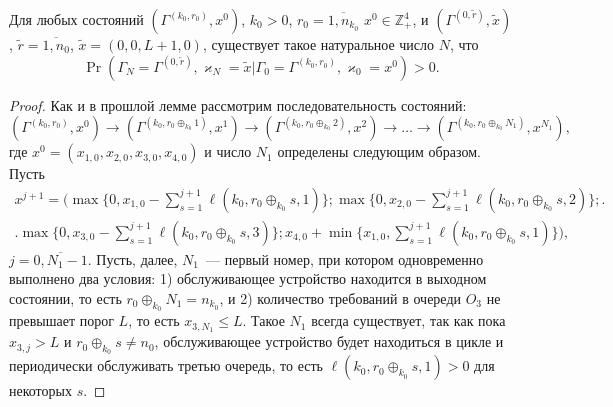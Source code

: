 \documentclass[a4paper,12pt,russian]{extarticle}
\begin{document}
\begin{lemma}\label{class:2}
Для любых состояний $(\Gamma^{(k_0,r_0)},x^0)$, $k_0 > 0$, $r_0=\overline{1,n_{k_0}}$ $x^0 \in \mathbb{Z}_+^4$, и $(\Gamma^{(0,\tilde{r})},\tilde{x})$, $\tilde{r} = \overline{1,n_0}$, $\tilde{x}=(0,0,L+1,0)$, существует такое натуральное число $N$, что 
\begin{equation*}
\Pr(\Gamma_{N}=\Gamma^{(0,\tilde{r} )}, \varkappa_{N}=\tilde{x}|
\Gamma_{0}=\Gamma^{(k_0,r_0)}, \varkappa_{0}=x^0)>0.
\end{equation*}
\end{lemma}
\begin{proof}
Как и в прошлой лемме рассмотрим последовательность состояний: 
\begin{equation*}
(\Gamma^{(k_0,r_0)},x^0) \rightarrow (\Gamma^{(k_0,r_0\oplus_{k_0}1)},x^1) \rightarrow (\Gamma^{(k_0,r_0\oplus_{k_0}2)},x^2) \rightarrow \ldots \rightarrow (\Gamma^{(k_0,r_0\oplus_{k_0}N_1)},x^{N_1}),
\end{equation*}
где $x^0=(x_{1,0}, x_{2,0}, x_{3,0}, x_{4,0})$ и число $N_1$ определены следующим образом. Пусть 
\begin{multline*}
x^{j+1}=\biggl(\max{\biggl\{0,x_{1,0} - \sum_{s=1}^{j+1}\ell(k_0,r_0\oplus_{k_0}s,1)\biggr\}};
\max{\biggl\{0,x_{2,0} - \sum_{s=1}^{j+1}\ell(k_0,r_0\oplus_{k_0}s,2)\biggr\}};\biggr.\\
\biggl.\max{\biggl\{0,x_{3,0} - \sum_{s=1}^{j+1}\ell(k_0,r_0\oplus_{k_0}s,3)\biggr\}};
x_{4,0} + \min{\biggl\{x_{1,0}, \sum_{s=1}^{j+1}\ell(k_0,r_0\oplus_{k_0}s,1)\biggr\}}\biggr),
\end{multline*}
$j=\overline{0,N_1-1}$. Пусть, далее, $N_1$~--- первый номер, при котором одновременно выполнено два условия: 1) обслуживающее устройство находится в выходном состоянии, то есть $r_0\oplus_{k_0}N_1 = n_{k_0}$, и 2) количество требований в очереди $O_3$ не превышает порог $L$, то есть  $x_{3,N_1}\leqslant L$. Такое $N_1$ всегда существует, так как пока $x_{3,j}>L$ и $r_0\oplus_{k_0}s \neq n_0$, обслуживающее устройство будет находиться в цикле и периодически обслуживать третью очередь, то есть $\ell(k_0,r_0\oplus_{k_0}s,1)>0$  для некоторых $s$.


\end{proof}
\end{document}
